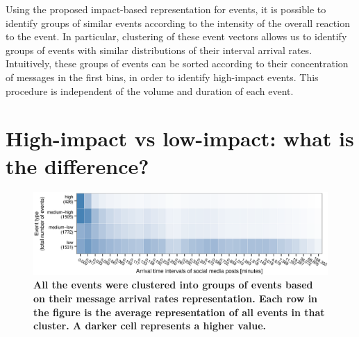 \documentclass[10pt,letterpaper]{article}
\begin{document}
Using the proposed impact-based representation for events, it is
possible to identify groups of similar events according to the
intensity of the overall reaction to the event. In particular,
clustering of these event vectors allows us to identify groups of
events with similar distributions of their interval arrival rates.
Intuitively, these groups of events can be sorted according to their
concentration of messages in the first bins, in order to identify
high-impact events. This procedure is independent of the volume and
duration of each event.
\section{High-impact vs low-impact: what is the difference?}
\label{sec:diff}

\begin{figure}
  \includegraphics[width=\textwidth]{figures_SI/Plots_from_data/heatmap_summarized}
  \caption{\textbf{All the events were clustered into groups of events
      based on their message arrival rates representation. Each row in
      the figure is the average representation of all events in that
      cluster. A darker cell represents a higher value.}}
  \label{fig:low_buzz_high_buzz}
\end{figure}
\end{document}
